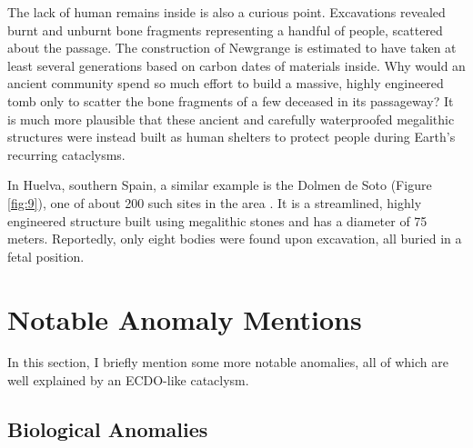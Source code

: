\documentclass[10pt,twocolumn,letterpaper]{article}
\begin{document}
The lack of human remains inside is also a curious point. Excavations revealed burnt and unburnt bone fragments representing a handful of people, scattered about the passage. The construction of Newgrange is estimated to have taken at least several generations based on carbon dates of materials inside. Why would an ancient community spend so much effort to build a massive, highly engineered tomb only to scatter the bone fragments of a few deceased in its passageway? It is much more plausible that these ancient and carefully waterproofed megalithic structures were instead built as human shelters to protect people during Earth’s recurring cataclysms.

In Huelva, southern Spain, a similar example is the Dolmen de Soto (Figure \ref{fig:9}), one of about 200 such sites in the area \cite{72,32}. It is a streamlined, highly engineered structure built using megalithic stones and has a diameter of 75 meters. Reportedly, only eight bodies were found upon excavation, all buried in a fetal position.

\section{Notable Anomaly Mentions}

In this section, I briefly mention some more notable anomalies, all of which are well explained by an ECDO-like cataclysm.

\subsection{Biological Anomalies}
\end{document}
